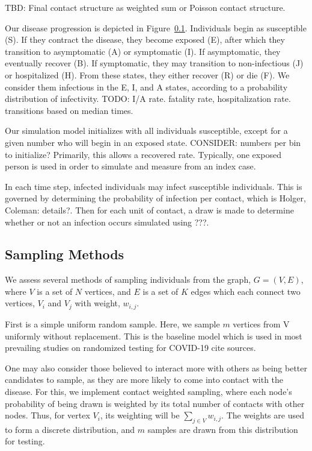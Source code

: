 \documentclass[fleqn,10pt]{SelfArx} %
\newcommand{\ed}[1]{{\color{blue} #1}}
\begin{document}
\ed{TBD:  Final contact structure as weighted sum or Poisson contact structure.}

Our disease progression is depicted in Figure~\ref{}.  Individuals begin as susceptible (S).  If they contract the disease, they become exposed (E), after which they transition to asymptomatic (A) or symptomatic (I).  If asymptomatic, they eventually recover (B).  If symptomatic, they may transition to non-infectious (J) or hospitalized (H).  From these states, they either recover (R) or die (F).  We consider them infectious in the E, I, and A states, according to a probability distribution of infectivity.  \ed{TODO:  I/A rate.  fatality rate, hospitalization rate.  transitions based on median times.}

Our simulation model initializes with all individuals susceptible, except for a given number who will begin in an exposed state.  \ed{CONSIDER: numbers per bin to initialize?  Primarily, this allows a recovered rate.}  Typically, one exposed person is used in order to simulate and measure from an index case.  

In each time step, infected individuals may infect susceptible individuals.  This is governed by determining the probability of infection per contact, which is \ed{Holger, Coleman:  details?}.  Then for each unit of contact, a draw is made to determine whether or not an infection occurs \ed{simulated using ???}.



\subsection{Sampling Methods}

We assess several methods of sampling individuals from the graph, $G = (V,E)$, where $V$ is a set of $N$ vertices, and $E$ is a set of $K$ edges which each connect two vertices, $V_i$ and $V_j$ with weight, $w_{i,j}$.

First is a simple uniform random sample.  Here, we sample $m$ vertices from V uniformly without replacement.  This is the baseline model which is used in most prevailing studies on randomized testing for COVID-19 \ed{cite sources}.  

One may also consider those believed to interact more with others as being better candidates to sample, as they are more likely to come into contact with the disease.  For this, we implement contact weighted sampling, where each node's probability of being drawn is weighted by its total number of contacts with other nodes.  Thus, for vertex $V_i$, its weighting will be $\sum_{j \in V} w_{i,j}$.  The weights are used to form a discrete distribution, and $m$ samples are drawn from this distribution for testing.   
\end{document}
